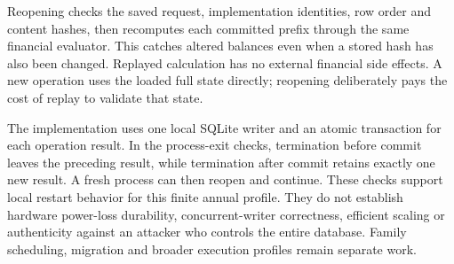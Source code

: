 Reopening checks the saved request, implementation identities, row order and
content hashes, then recomputes each committed prefix through the same financial
evaluator.  This catches altered balances even when a stored hash has also
been changed.  Replayed calculation has no external financial side effects.
A new operation uses the loaded full state directly; reopening deliberately
pays the cost of replay to validate that state.

The implementation uses one local SQLite writer and an atomic transaction for
each operation result.  In the process-exit checks, termination before commit
leaves the preceding result, while termination after commit retains exactly one
new result.  A fresh process can then reopen and continue.  These checks support
local restart behavior for this finite annual profile.  They do not establish
hardware power-loss durability, concurrent-writer correctness, efficient scaling
or authenticity against an attacker who controls the entire database.  Family
scheduling, migration and broader execution profiles remain separate work.
